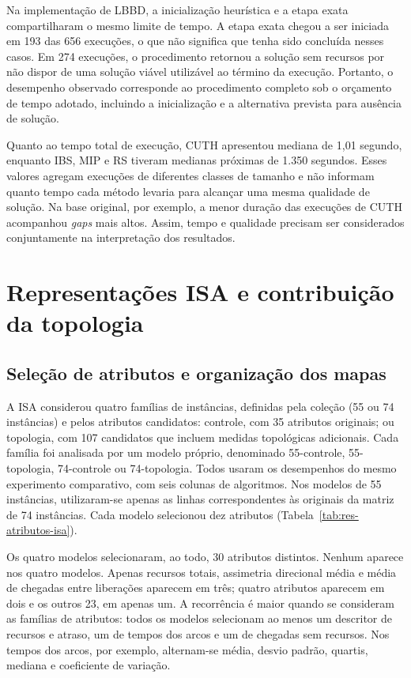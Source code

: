 Na implementação de LBBD, a inicialização heurística e a etapa exata
compartilharam o mesmo limite de tempo. A etapa exata chegou a ser
iniciada em 193 das 656 execuções, o que não significa que tenha sido
concluída nesses casos. Em 274 execuções, o procedimento retornou a
solução sem recursos por não dispor de uma solução viável utilizável
ao término da execução. Portanto, o desempenho observado corresponde
ao procedimento completo sob o orçamento de tempo adotado, incluindo
a inicialização e a alternativa prevista para ausência de solução.

Quanto ao tempo total de execução, CUTH apresentou mediana de 1,01
segundo, enquanto IBS, MIP e RS tiveram medianas próximas de 1.350
segundos. Esses valores agregam execuções de diferentes classes de
tamanho e não informam quanto tempo cada método levaria para alcançar
uma mesma qualidade de solução. Na base original, por exemplo, a menor
duração das execuções de CUTH acompanhou \textit{gaps} mais altos.
Assim, tempo e qualidade precisam ser considerados conjuntamente na
interpretação dos resultados.

\section{Representações ISA e contribuição da topologia}\label{sec:res-isa}

\subsection{Seleção de atributos e organização dos mapas}

A ISA considerou quatro famílias de instâncias, definidas pela coleção
(55 ou 74 instâncias) e pelos atributos candidatos: controle, com 35
atributos originais; ou topologia, com 107 candidatos que incluem medidas
topológicas adicionais. Cada família foi analisada por um modelo próprio,
denominado 55-controle, 55-topologia, 74-controle ou 74-topologia.
Todos usaram os desempenhos do mesmo experimento comparativo, com seis
colunas de algoritmos. Nos modelos de 55 instâncias, utilizaram-se apenas
as linhas correspondentes às originais da matriz de 74 instâncias.
Cada modelo selecionou dez atributos (Tabela~\ref{tab:res-atributos-isa}).



Os quatro modelos selecionaram, ao todo, 30 atributos distintos.
Nenhum aparece nos quatro modelos. Apenas recursos totais, assimetria
direcional média e média de chegadas entre liberações aparecem em três;
quatro atributos aparecem em dois e os outros 23, em apenas um.
A recorrência é maior quando se consideram as famílias de atributos:
todos os modelos selecionam ao menos um descritor de recursos e atraso,
um de tempos dos arcos e um de chegadas sem recursos. Nos tempos dos
arcos, por exemplo, alternam-se média, desvio padrão, quartis, mediana
e coeficiente de variação.


